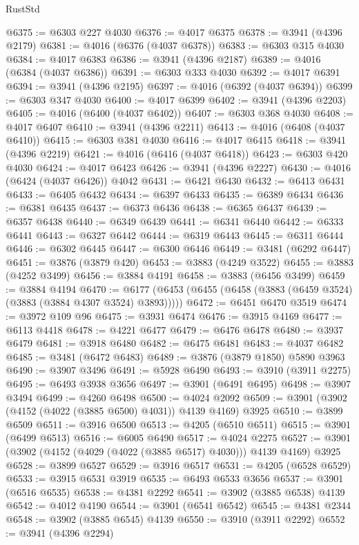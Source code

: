 \begin{lexlean}{RustStd}
\begin{coremodule}
@6375 := @6303 @227 @4030
@6376 := @4017 @6375
@6378 := @3941 (@4396 @2179)
@6381 := @4016 (@6376 (@4037 @6378))
@6383 := @6303 @315 @4030
@6384 := @4017 @6383
@6386 := @3941 (@4396 @2187)
@6389 := @4016 (@6384 (@4037 @6386))
@6391 := @6303 @333 @4030
@6392 := @4017 @6391
@6394 := @3941 (@4396 @2195)
@6397 := @4016 (@6392 (@4037 @6394))
@6399 := @6303 @347 @4030
@6400 := @4017 @6399
@6402 := @3941 (@4396 @2203)
@6405 := @4016 (@6400 (@4037 @6402))
@6407 := @6303 @368 @4030
@6408 := @4017 @6407
@6410 := @3941 (@4396 @2211)
@6413 := @4016 (@6408 (@4037 @6410))
@6415 := @6303 @381 @4030
@6416 := @4017 @6415
@6418 := @3941 (@4396 @2219)
@6421 := @4016 (@6416 (@4037 @6418))
@6423 := @6303 @420 @4030
@6424 := @4017 @6423
@6426 := @3941 (@4396 @2227)
@6430 := @4016 (@6424 (@4037 @6426)) @4042
@6431 := @6421 @6430
@6432 := @6413 @6431
@6433 := @6405 @6432
@6434 := @6397 @6433
@6435 := @6389 @6434
@6436 := @6381 @6435
@6437 := @6373 @6436
@6438 := @6365 @6437
@6439 := @6357 @6438
@6440 := @6349 @6439
@6441 := @6341 @6440
@6442 := @6333 @6441
@6443 := @6327 @6442
@6444 := @6319 @6443
@6445 := @6311 @6444
@6446 := @6302 @6445
@6447 := @6300 @6446
@6449 := @3481 (@6292 @6447)
@6451 := @3876 (@3879 @420)
@6453 := @3883 (@4249 @3522)
@6455 := @3883 (@4252 @3499)
@6456 := @3884 @4191
@6458 := @3883 (@6456 @3499)
@6459 := @3884 @4194
@6470 := @6177 (@6453 (@6455 (@6458 (@3883 (@6459 @3524) (@3883 (@3884 @4307 @3524) @3893)))))
@6472 := @6451 @6470 @3519
@6474 := @3972 @109 @96
@6475 := @3931 @6474
@6476 := @3915 @4169
@6477 := @6113 @4418
@6478 := @4221 @6477
@6479 := @6476 @6478
@6480 := @3937 @6479
@6481 := @3918 @6480
@6482 := @6475 @6481
@6483 := @4037 @6482
@6485 := @3481 (@6472 @6483)
@6489 := @3876 (@3879 @1850) @5890 @3963
@6490 := @3907 @3496
@6491 := @5928 @6490
@6493 := @3910 (@3911 @2275)
@6495 := @6493 @3938 @3656
@6497 := @3901 (@6491 @6495)
@6498 := @3907 @3494
@6499 := @4260 @6498
@6500 := @4024 @2092
@6509 := @3901 (@3902 (@4152 (@4022 (@3885 @6500) @4031)) @4139 @4169) @3925
@6510 := @3899 @6509
@6511 := @3916 @6500
@6513 := @4205 (@6510 @6511)
@6515 := @3901 (@6499 @6513)
@6516 := @6005 @6490
@6517 := @4024 @2275
@6527 := @3901 (@3902 (@4152 (@4029 (@4022 (@3885 @6517) @4030))) @4139 @4169) @3925
@6528 := @3899 @6527
@6529 := @3916 @6517
@6531 := @4205 (@6528 @6529)
@6533 := @3915 @6531 @3919
@6535 := @6493 @6533 @3656
@6537 := @3901 (@6516 @6535)
@6538 := @4381 @2292
@6541 := @3902 (@3885 @6538) @4139
@6542 := @4012 @4190
@6544 := @3901 (@6541 @6542)
@6545 := @4381 @2344
@6548 := @3902 (@3885 @6545) @4139
@6550 := @3910 (@3911 @2292)
@6552 := @3941 (@4396 @2294)

\end{coremodule}
\end{lexlean}
